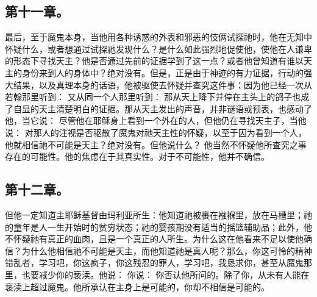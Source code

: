 
\subsection{第十一章。}

\par

最后，至于魔鬼本身，当他用各种诱惑的外表和邪恶的伎俩试探祂时，他在无知中怀疑什么，或者想通过试探祂发现什么？是什么如此强烈地促使他，使他在人谦卑的形态下寻找天主？他是否通过先前的证据学到了这一点？或者他曾知道有谁以天主的身份来到人的身体中？绝对没有。但是，正是由于神迹的有力证据，行动的强大结果，以及真理本身的话语，他被驱使去怀疑并查究这件事：因为他已经一次从若翰那里听到： 又从同一个人那里听到： 那从天上降下并停在主头上的鸽子也成了自显的天主清楚明白的证据。那从天主发出的声音，并非谜语或预表，也感动了他，当它说： 尽管他在耶稣身上看到一个外在的人，但他仍在寻找天主子，当他说： 对那人的注视是否驱散了魔鬼对祂天主性的怀疑，以至于因为看到一个人，他就相信祂不可能是天主？绝对没有。但他说什么？ 他当然不怀疑他所查究之事存在的可能性。他的焦虑在于其真实性。对于不可能性，他并不确信。\par


\subsection{第十二章。}

\par

但他一定知道主耶稣基督由玛利亚所生：他知道祂被裹在襁褓里，放在马槽里；祂的童年是人一生开始时的贫穷状态；祂的婴孩期没有适当的摇篮辅助品；此外，他不怀疑祂有真正的血肉，且是一个真正的人所生。为什么这在他看来不足以使他确信？为什么他相信祂不可能是天主，而他知道祂是真人呢？那么，你这可怜的精神错乱者，学习吧，你这疯子，你这残忍的罪人，学习吧，我恳求你，甚至从魔鬼那里，也要减少你的亵渎。他说： 你说： 你否认他所问的。除了你，从未有人能在亵渎上超过魔鬼。他所承认在主身上是可能的，你却不相信是可能的。\par

